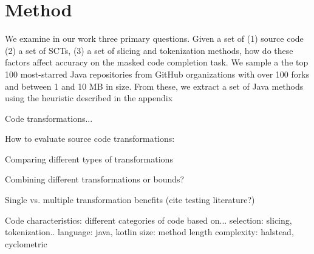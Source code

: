 \documentclass[sigconf,review,anonymous]{acmart}
\begin{document}
  \section{Method}

  We examine in our work three primary questions. Given a set of (1) source code (2) a set of SCTs, (3) a set of slicing and tokenization methods, how do these factors affect accuracy on the masked code completion task. We sample a the top 100 most-starred Java repositories from GitHub organizations with over 100 forks and between 1 and 10 MB in size. From these, we extract a set of Java methods using the heuristic described in the appendix

  Code transformations... %

  How to evaluate source code transformations:

  Comparing different types of transformations

  Combining different transformations or bounds?

  Single vs. multiple transformation benefits (cite testing literature?)

  Code characteristics: different categories of code based on...
  selection: slicing, tokenization..
  language: java, kotlin
  size: method length
  complexity: halstead, cyclometric


%

\end{document}
